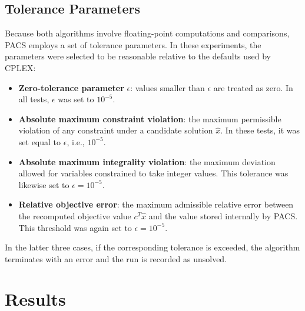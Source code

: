 \subsection{Tolerance Parameters}
Because both algorithms involve floating-point computations and comparisons, PACS employs a set of tolerance parameters. In these experiments, the parameters were selected to be reasonable relative to the defaults used by CPLEX:
\begin{itemize}
    \item \textbf{Zero-tolerance parameter} $\epsilon$: values smaller than $\epsilon$ are treated as zero. In all tests, $\epsilon$ was set to $10^{-5}$.
    \item \textbf{Absolute maximum constraint violation}: the maximum permissible violation of any constraint under a candidate solution $\hat{x}$. In these tests, it was set equal to $\epsilon$, i.e., $10^{-5}$.
    \item \textbf{Absolute maximum integrality violation}: the maximum deviation allowed for variables constrained to take integer values. This tolerance was likewise set to $\epsilon = 10^{-5}$.
    \item \textbf{Relative objective error}: the maximum admissible relative error between the recomputed objective value $c^T \hat{x}$ and the value stored internally by PACS. This threshold was again set to $\epsilon = 10^{-5}$.  
\end{itemize}  
In the latter three cases, if the corresponding tolerance is exceeded, the algorithm terminates with an error and the run is recorded as unsolved.  

\section{Results}
%
%
%